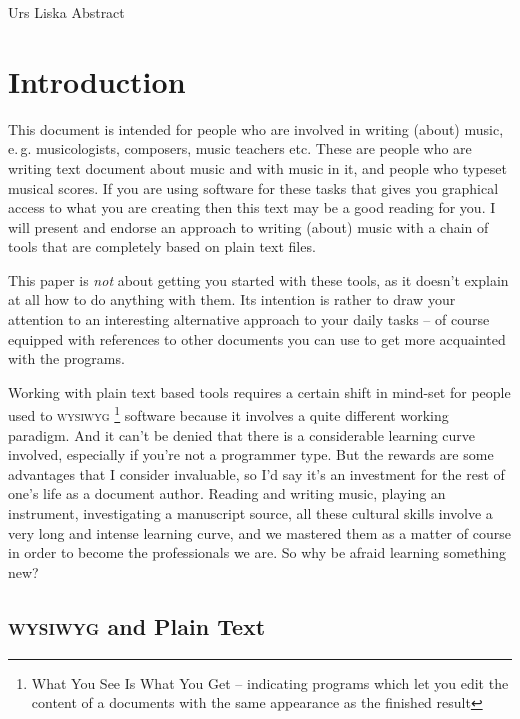 \documentclass[../../LilyPond-Tutorials]{subfiles}
\begin{document}
\begin{authorAbstract}{Urs Liska}
Abstract
\end{authorAbstract}

\chapter{Introduction}

This document is intended for people who are involved in writing (about) music, e.\,g. musicologists, composers, music teachers etc.
These are people who are writing text document about music and with music in it, and people who typeset musical scores.
If you are using software for these tasks that gives you graphical access to what you are creating then this text may be a good reading for you.
I will present and endorse an approach to writing (about) music with a chain of tools that are completely based on plain text files.

This paper is \emph{not} about getting you started with these tools, as it doesn't explain at all how to do anything with them.
Its intention is rather to draw your attention to an interesting alternative approach to your daily tasks -- of course equipped with references to other documents you can use to get more acquainted with the programs.

Working with plain text based tools requires a certain shift in mind-set for people used to \textsc{wysiwyg}%
\footnote{What You See Is What You Get -- indicating programs which let you edit the content of a documents with the same appearance as the finished result} software because it involves a quite different working paradigm.
And it can't be denied that there is a considerable learning curve involved, especially if you're not a programmer type.
But the rewards are some advantages that I consider invaluable, so I'd say it's an investment for the rest of one's life as a document author.
Reading and writing music, playing an instrument, investigating a manuscript source, all these cultural skills involve a very long and intense learning curve, and we mastered them as a matter of course in order to become the professionals we are.
So why be afraid learning something new?

\section*{\textsc{wysiwyg} and Plain Text}
\end{document}
